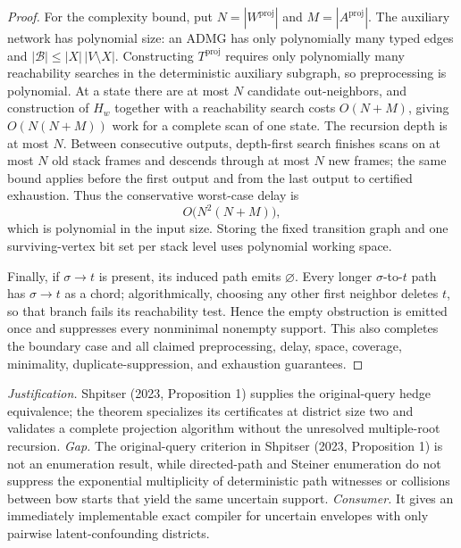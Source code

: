 \documentclass{article}
\begin{document}
\begin{proof}
For the complexity bound, put \(N=|W^{\mathrm{proj}}|\) and \(M=|A^{\mathrm{proj}}|\).  The auxiliary network has polynomial size: an ADMG has only polynomially many typed edges and \(|\mathcal B|\leq |X|\,|V\setminus X|\).  Constructing \(T^{\mathrm{proj}}\) requires only polynomially many reachability searches in the deterministic auxiliary subgraph, so preprocessing is polynomial.  At a state there are at most \(N\) candidate out-neighbors, and construction of \(H_w\) together with a reachability search costs \(O(N+M)\), giving \(O(N(N+M))\) work for a complete scan of one state.  The recursion depth is at most \(N\).  Between consecutive outputs, depth-first search finishes scans on at most \(N\) old stack frames and descends through at most \(N\) new frames; the same bound applies before the first output and from the last output to certified exhaustion.  Thus the conservative worst-case delay is
\[
 O\bigl(N^2(N+M)\bigr),
\]
which is polynomial in the input size.  Storing the fixed transition graph and one surviving-vertex bit set per stack level uses polynomial working space.

Finally, if \(\sigma\to t\) is present, its induced path emits \(\varnothing\).  Every longer \(\sigma\)-to-\(t\) path has \(\sigma\to t\) as a chord; algorithmically, choosing any other first neighbor deletes \(t\), so that branch fails its reachability test.  Hence the empty obstruction is emitted once and suppresses every nonminimal nonempty support.  This also completes the boundary case and all claimed preprocessing, delay, space, coverage, minimality, duplicate-suppression, and exhaustion guarantees.
\end{proof}
\par\smallskip\noindent \textit{Justification.} Shpitser (2023, Proposition 1) supplies the original-query hedge equivalence; the theorem specializes its certificates at district size two and validates a complete projection algorithm without the unresolved multiple-root recursion. \textit{Gap.} The original-query criterion in Shpitser (2023, Proposition 1) is not an enumeration result, while directed-path and Steiner enumeration do not suppress the exponential multiplicity of deterministic path witnesses or collisions between bow starts that yield the same uncertain support. \textit{Consumer.} It gives an immediately implementable exact compiler for uncertain envelopes with only pairwise latent-confounding districts.
\end{document}
